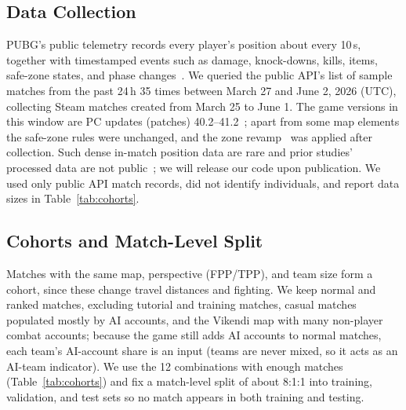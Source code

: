 \documentclass[sigconf,anonymous,nonacm]{acmart}
\begin{document}
\subsection{Data Collection}
\label{sec:method:data}
PUBG's public telemetry records every player's position about every 10\,s, together with timestamped events such as damage, knock-downs, kills, items, safe-zone states, and phase changes~\cite{PUBGAPI}.
We queried the public API's list of sample matches from the past 24\,h 35 times between March 27 and June 2, 2026 (UTC), collecting Steam matches created from March 25 to June 1.
The game versions in this window are PC updates (patches) 40.2--41.2~\cite{PUBGPatchNotes2026}; apart from some map elements the safe-zone rules were unchanged, and the zone revamp~\cite{PUBGBlueZone2026} was applied after collection.
Such dense in-match position data are rare and prior studies' processed data are not public~\cite{Sagong25a,KRAFTON}; we will release our code upon publication.
We used only public API match records, did not identify individuals, and report data sizes in Table~\ref{tab:cohorts}.

\subsection{Cohorts and Match-Level Split}
\label{sec:method:cohort}
Matches with the same map, perspective (FPP/TPP), and team size form a cohort, since these change travel distances and fighting.
We keep normal and ranked matches, excluding tutorial and training matches, casual matches populated mostly by AI accounts, and the Vikendi map with many non-player combat accounts; because the game still adds AI accounts to normal matches, each team's AI-account share is an input (teams are never mixed, so it acts as an AI-team indicator).
We use the 12 combinations with enough matches (Table~\ref{tab:cohorts}) and fix a match-level split of about 8:1:1 into training, validation, and test sets so no match appears in both training and testing.
\end{document}
